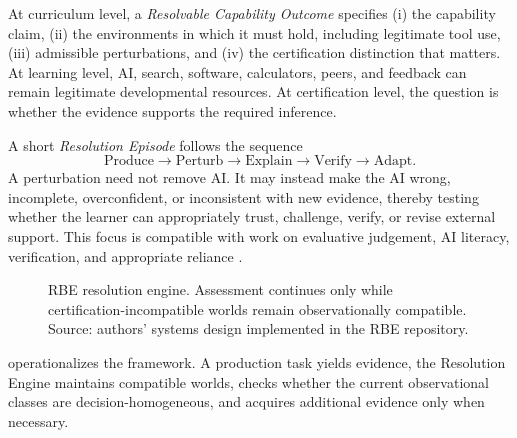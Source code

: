\documentclass[11pt]{article}
\begin{document}
At curriculum level, a \emph{Resolvable Capability Outcome} specifies (i) the capability claim, (ii) the environments in which it must hold, including legitimate tool use, (iii) admissible perturbations, and (iv) the certification distinction that matters. At learning level, AI, search, software, calculators, peers, and feedback can remain legitimate developmental resources. At certification level, the question is whether the evidence supports the required inference.

A short \emph{Resolution Episode} follows the sequence
\[
 \text{Produce}\rightarrow\text{Perturb}\rightarrow\text{Explain}\rightarrow\text{Verify}\rightarrow\text{Adapt}.
\]
A perturbation need not remove AI. It may instead make the AI wrong, incomplete, overconfident, or inconsistent with new evidence, thereby testing whether the learner can appropriately trust, challenge, verify, or revise external support. This focus is compatible with work on evaluative judgement, AI literacy, verification, and appropriate reliance \parencite{bearman2024evaluative,tzirides2024ailiteracy,fok2024verifiability,passi2024reliance}.

\begin{figure}[t]
\centering
{}
\caption{RBE resolution engine. Assessment continues only while certification-incompatible worlds remain observationally compatible. Source: authors' systems design implemented in the RBE repository.}
\label{fig:engine}
\end{figure}

 operationalizes the framework. A production task yields evidence, the Resolution Engine maintains compatible worlds, checks whether the current observational classes are decision-homogeneous, and acquires additional evidence only when necessary.
\end{document}
